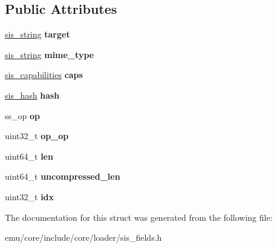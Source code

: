 \subsection*{Public Attributes}
\begin{DoxyCompactItemize}
\item 
\mbox{\label{structeka2l1_1_1loader_1_1sis__file__des_a82f8b144ae359138e4933e84c8cfa45f}} 
\mbox{\hyperlink{structeka2l1_1_1loader_1_1sis__string}{sis\+\_\+string}} {\bfseries target}
\item 
\mbox{\label{structeka2l1_1_1loader_1_1sis__file__des_ac58ef5cc5a989977bc8bfba0f07e42be}} 
\mbox{\hyperlink{structeka2l1_1_1loader_1_1sis__string}{sis\+\_\+string}} {\bfseries mime\+\_\+type}
\item 
\mbox{\label{structeka2l1_1_1loader_1_1sis__file__des_a985bfa43e4b6f5dab7fbd1d8f2426baa}} 
\mbox{\hyperlink{structeka2l1_1_1loader_1_1sis__capabilities}{sis\+\_\+capabilities}} {\bfseries caps}
\item 
\mbox{\label{structeka2l1_1_1loader_1_1sis__file__des_ae099b655e8fad15263f1de0b026604d1}} 
\mbox{\hyperlink{structeka2l1_1_1loader_1_1sis__hash}{sis\+\_\+hash}} {\bfseries hash}
\item 
\mbox{\label{structeka2l1_1_1loader_1_1sis__file__des_a09f04cdbe464b82297df020b92ff73ee}} 
ss\+\_\+op {\bfseries op}
\item 
\mbox{\label{structeka2l1_1_1loader_1_1sis__file__des_af8b79e43db89080a3bc67a692d9921be}} 
uint32\+\_\+t {\bfseries op\+\_\+op}
\item 
\mbox{\label{structeka2l1_1_1loader_1_1sis__file__des_a65e2120769482c7a3457b296fd4d0ffb}} 
uint64\+\_\+t {\bfseries len}
\item 
\mbox{\label{structeka2l1_1_1loader_1_1sis__file__des_a00b7bc624bdd69f4da43b7565af1139c}} 
uint64\+\_\+t {\bfseries uncompressed\+\_\+len}
\item 
\mbox{\label{structeka2l1_1_1loader_1_1sis__file__des_ad37b9214646c455881700d86f5a69dfa}} 
uint32\+\_\+t {\bfseries idx}
\end{DoxyCompactItemize}


The documentation for this struct was generated from the following file\+:\begin{DoxyCompactItemize}
\item 
emu/core/include/core/loader/sis\+\_\+fields.\+h\end{DoxyCompactItemize}
